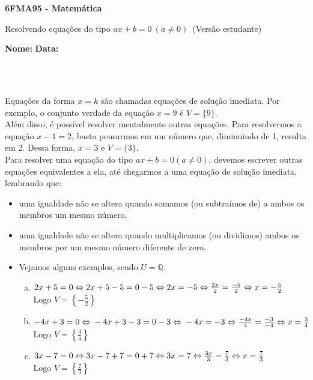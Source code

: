 \documentclass[a4paper,14pt]{article}
\begin{document}
	
	\noindent\textbf{6FMA95 - Matemática} 
	
	\begin{center}Resolvendo equações do tipo $ax+b = 0~(a \neq 0)$~(Versão estudante)
	\end{center}
	
	\noindent\textbf{Nome:} \underline{\hspace{10cm}}
	\noindent\textbf{Data:} \underline{\hspace{4cm}}
	
	~ \\ ~
	\begin{multicols}{2}
	\noindent Equações da forma $x = k$ são chamadas equações de solução imediata. Por exemplo, o conjunto verdade da equação $x = 9$ é $V = \{9\}$. \\
	Além disso, é possível resolver mentalmente outras equações. Para resolvermos a equação $x - 1 = 2$, basta pensarmos em um número que, diminuindo de 1, resulta em 2. Dessa forma, $x = 3$ e $V = \{3\}$. \\
	Para resolver uma equação do tipo $ax + b = 0 (a \neq 0)$, devemos escrever outras equações equivalentes a ela, até chegarmos a uma equação de solução imediata, lembrando que: \\
	\begin{itemize}
		\item uma igualdade não se altera quando somamos (ou subtraímos de) a ambos os membros um mesmo número.
		\item uma igualdade não se altera quando multiplicamos (ou dividimos) ambos os membros por um mesmo número diferente de zero.
		\item Vejamos alguns exemplos, sendo $U = \mathbb{Q}$.
		\begin{enumerate}[a)]
			\item \noindent$2x + 5 = 0 \\ \Leftrightarrow 2x + 5 - 5 = 0 - 5 \Leftrightarrow \\ 2x = -5 \Leftrightarrow \frac{2x}{2} = \frac{-5}{2} \Leftrightarrow \\ x = -\frac{5}{2}$ \\
			Logo $V = \left\{-\frac{5}{2}\right\}$
			\item \noindent$-4x + 3 = 0 \Leftrightarrow \\ -4x + 3 - 3 = 0 - 3 \Leftrightarrow \\ -4x = -3 \Leftrightarrow \frac{-4x}{4} = \frac{-3}{-4} \Leftrightarrow x = \frac{3}{4}$ \\
			Logo $V = \left\{\frac{3}{4}\right\}$
			\item \noindent$3x - 7 = 0 \Leftrightarrow \\ 3x -7 + 7 = 0 + 7 \Leftrightarrow \\ 3x = 7 \Leftrightarrow \frac{3x}{3} = \frac{7}{3} \Leftrightarrow x = \frac{7}{3}$ \\
			Logo $V	= \left\{\frac{7}{3}\right\}$		
		\end{enumerate}
	\end{itemize}
	\end{multicols}
\end{document}
